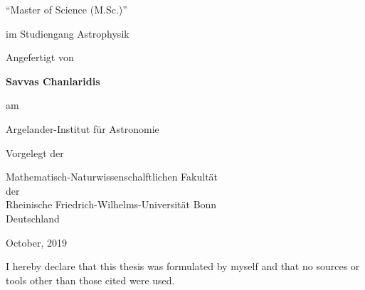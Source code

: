 \documentclass[a4paper, 11pt, twoside]{book}
\def\thesisauthor{Savvas Chanlaridis}
\begin{document}
\begin{titlepage}
\begin{center}
           “Master of Science (M.Sc.)” \\
           
            \vspace{1.0cm}
            
          im Studiengang Astrophysik

            \vspace{1cm}

            {\normalsize Angefertigt von} 
             
           \vspace{0.5cm}            
            
            \textbf{\thesisauthor}
            
            \vspace{1cm}
            
            {\normalsize am}
            
            \vspace{0.5cm}
            
            \Large
            
            Argelander-Institut f\"ur Astronomie

            \vspace{1cm}
            
            {\normalsize Vorgelegt der }
            
            \vspace{0.5cm}


            \Large
         
            Mathematisch-Naturwissenschalftlichen Fakult\"at \\
            der \\
            Rheinische Friedrich-Wilhelms-Universit\"at Bonn\\
            Deutschland

            \vspace{1.5cm}

            \Large
            October, 2019

        \end{center}
    \end{titlepage}

    \newpage  %
    \mbox{}
    \thispagestyle{empty}
    
    \newpage
    \thispagestyle{empty}
    \par\vspace*{\fill}
    \noindent I hereby declare that this thesis was formulated by myself and that no sources or tools other than those cited were used.
    \vspace{0.8cm}
\end{document}
